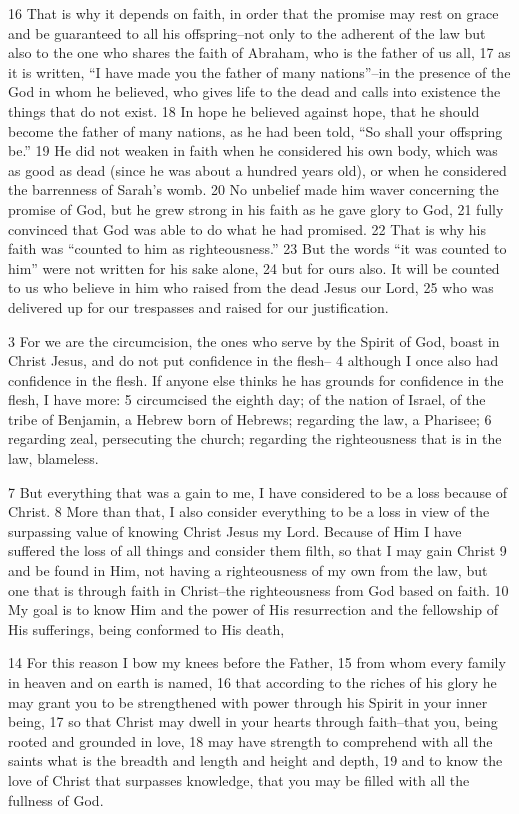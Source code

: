 \begin{bible}
16 That is why it depends on faith, in order that the promise may rest on grace and be guaranteed to all his offspring--not only to the adherent of the law but also to the one who shares the faith of Abraham, who is the father of us all, 17 as it is written, ``I have made you the father of many nations''--in the presence of the God in whom he believed, who gives life to the dead and calls into existence the things that do not exist. 18 In hope he believed against hope, that he should become the father of many nations, as he had been told, ``So shall your offspring be.'' 19 He did not weaken in faith when he considered his own body, which was as good as dead (since he was about a hundred years old), or when he considered the barrenness of Sarah's womb. 20 No unbelief made him waver concerning the promise of God, but he grew strong in his faith as he gave glory to God, 21 fully convinced that God was able to do what he had promised. 22 That is why his faith was ``counted to him as righteousness.'' 23 But the words ``it was counted to him'' were not written for his sake alone, 24 but for ours also. It will be counted to us who believe in him who raised from the dead Jesus our Lord, 25 who was delivered up for our trespasses and raised for our justification.

3 For we are the circumcision, the ones who serve by the Spirit of God, boast in Christ Jesus, and do not put confidence in the flesh-- 4 although I once also had confidence in the flesh. If anyone else thinks he has grounds for confidence in the flesh, I have more: 5 circumcised the eighth day; of the nation of Israel, of the tribe of Benjamin, a Hebrew born of Hebrews; regarding the law, a Pharisee; 6 regarding zeal, persecuting the church; regarding the righteousness that is in the law, blameless.

7 But everything that was a gain to me, I have considered to be a loss because of Christ. 8 More than that, I also consider everything to be a loss in view of the surpassing value of knowing Christ Jesus my Lord. Because of Him I have suffered the loss of all things and consider them filth, so that I may gain Christ 9 and be found in Him, not having a righteousness of my own from the law, but one that is through faith in Christ--the righteousness from God based on faith. 10 My goal is to know Him and the power of His resurrection and the fellowship of His sufferings, being conformed to His death,

14 For this reason I bow my knees before the Father, 15 from whom every family in heaven and on earth is named, 16 that according to the riches of his glory he may grant you to be strengthened with power through his Spirit in your inner being, 17 so that Christ may dwell in your hearts through faith--that you, being rooted and grounded in love, 18 may have strength to comprehend with all the saints what is the breadth and length and height and depth, 19 and to know the love of Christ that surpasses knowledge, that you may be filled with all the fullness of God.


\end{bible}
